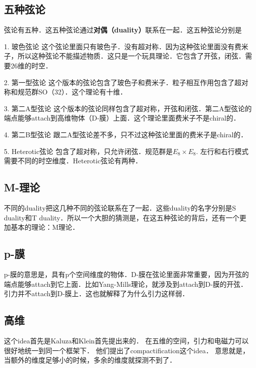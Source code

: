 
\begin{issues}
\issueNeedCite
\issueMissDepend
\end{issues}

\subsection{五种弦论}

弦论有五种．这五种弦论通过\textbf{对偶（duality）}联系在一起．这五种弦论分别是

1. 玻色弦论
这个弦论里面只有玻色子．没有超对称．因为这种弦论里面没有费米子，所以这种弦论不能描述物质．这只是一个玩具理论．它包含了开弦，闭弦．需要26维的时空．

2. 第一型弦论
这个版本的弦论包含了玻色子和费米子．粒子相互作用包含了超对称和规范群SO（32）．这个理论有十维．

3. 第二A型弦论
这个版本的弦论同样包含了超对称，开弦和闭弦．第二A型弦论的端点能够attach到高维物体（D-膜）上面．这个理论里面费米子不是chiral的．

4. 第二B型弦论
跟二A型弦论差不多，只不过这种弦论里面的费米子是chiral的．

5. Heterotic弦论
包含了超对称，只允许闭弦．规范群是$E_8\times E_8$. 左行和右行模式需要不同的时空维度．Heterotic弦论有两种．

\subsection{M-理论}
不同的duality把这几种不同的弦论联系在了一起．这些duality的名字分别是S duality和T duality．所以一个大胆的猜测是，在这五种弦论的背后，还有一个更加基本的理论：M理论．

\subsection{p-膜}
p-膜的意思是，具有p个空间维度的物体．D-膜在弦论里面非常重要，因为开弦的端点能够attach到它上面．比如Yang-Mills理论，就涉及到attach到D-膜的开弦． 引力并不attach到D-膜上．这也就解释了为什么引力这样弱．

\subsection{高维}
这个idea首先是Kaluza和Klein首先提出来的． 在五维的空间，引力和电磁力可以很好地统一到同一个框架下． 他们提出了compactification这个idea．
意思就是，当额外的维度足够小的时候，多余的维度就探测不到了． 
